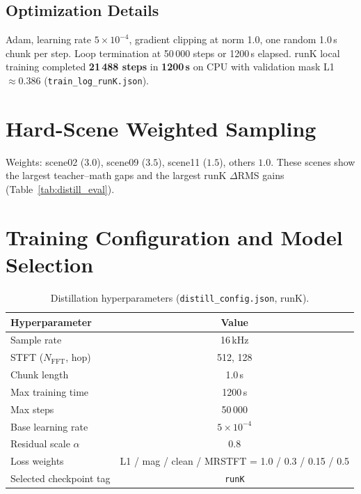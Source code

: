 \subsection{Optimization Details}

Adam, learning rate $5\times10^{-4}$, gradient clipping at norm 1.0, one random 1.0\,s chunk per step. Loop termination at 50\,000 steps or 1200\,s elapsed. runK local training completed \textbf{21\,488 steps} in \textbf{1200\,s} on CPU with validation mask L1 $\approx 0.386$ (\texttt{train\_log\_runK.json}).

\section{Hard-Scene Weighted Sampling}
\label{sec:hard_scenes}

Weights: scene02 ($3.0$), scene09 ($3.5$), scene11 ($1.5$), others $1.0$. These scenes show the largest teacher--math gaps and the largest runK $\Delta$RMS gains (Table~\ref{tab:distill_eval}).

\section{Training Configuration and Model Selection}
\label{sec:train_config}

\begin{table}[H]
  \centering
  \caption{Distillation hyperparameters (\texttt{distill\_config.json}, runK).}
  \label{tab:distill_config}
  \begin{tabular}{lc}
    \toprule
    \textbf{Hyperparameter} & \textbf{Value} \\
    \midrule
    Sample rate             & 16\,kHz \\
    STFT ($N_{\mathrm{FFT}}$, hop) & 512, 128 \\
    Chunk length            & 1.0\,s \\
    Max training time       & 1200\,s \\
    Max steps               & 50\,000 \\
    Base learning rate      & $5 \times 10^{-4}$ \\
    Residual scale $\alpha$ & 0.8 \\
    Loss weights            & L1 / mag / clean / MRSTFT = 1.0 / 0.3 / 0.15 / 0.5 \\
    Selected checkpoint tag & \texttt{runK} \\
    \bottomrule
  \end{tabular}
\end{table}

